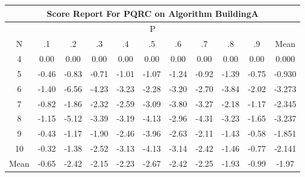 \documentclass[11pt,a4paper]{report}
\begin{document}
\begin{longtable}{ | c || c | c | c | c | c | c | c | c | c || c |}
\hline
\multicolumn{11}{|c|}{ Score Report For PQRC on Algorithm BuildingA} \\
\hline
\multicolumn{11}{|c|}{ P } \\
\hline
N & .1 & .2 & .3 & .4 & .5 & .6 & .7 & .8 & .9 & Mean\\
 \hline
 \hline
 \endhead
  4 &  \cellcolor[HTML]{FFFFFF} 0.00 &  \cellcolor[HTML]{FFFFFF} 0.00 &  \cellcolor[HTML]{FFFFFF} 0.00 &  \cellcolor[HTML]{FFFFFF} 0.00 &  \cellcolor[HTML]{FFFFFF} 0.00 &  \cellcolor[HTML]{FFFFFF} 0.00 &  \cellcolor[HTML]{FFFFFF} 0.00 &  \cellcolor[HTML]{FFFFFF} 0.00 &  \cellcolor[HTML]{FFFFFF} 0.00 & 0.000 \\
  5 &  \cellcolor[HTML]{FFF7F7} -0.46 &  \cellcolor[HTML]{FFE7E7} -0.83 &  \cellcolor[HTML]{FFEFEF} -0.71 &  \cellcolor[HTML]{FFE7E7} -1.01 &  \cellcolor[HTML]{FFE7E7} -1.07 &  \cellcolor[HTML]{FFDFDF} -1.24 &  \cellcolor[HTML]{FFE7E7} -0.92 &  \cellcolor[HTML]{FFDFDF} -1.39 &  \cellcolor[HTML]{FFEFEF} -0.75 & -0.930 \\
  6 &  \cellcolor[HTML]{FFDFDF} -1.40 &  \cellcolor[HTML]{FF5858} -6.56 &  \cellcolor[HTML]{FF9797} -4.23 &  \cellcolor[HTML]{FFAFAF} -3.23 &  \cellcolor[HTML]{FFC7C7} -2.28 &  \cellcolor[HTML]{FFAFAF} -3.20 &  \cellcolor[HTML]{FFB7B7} -2.70 &  \cellcolor[HTML]{FF9F9F} -3.84 &  \cellcolor[HTML]{FFCFCF} -2.02 & -3.273 \\
  7 &  \cellcolor[HTML]{FFE7E7} -0.82 &  \cellcolor[HTML]{FFCFCF} -1.86 &  \cellcolor[HTML]{FFC7C7} -2.32 &  \cellcolor[HTML]{FFBFBF} -2.59 &  \cellcolor[HTML]{FFAFAF} -3.09 &  \cellcolor[HTML]{FF9F9F} -3.80 &  \cellcolor[HTML]{FFAFAF} -3.27 &  \cellcolor[HTML]{FFC7C7} -2.18 &  \cellcolor[HTML]{FFDFDF} -1.17 & -2.345 \\
  8 &  \cellcolor[HTML]{FFDFDF} -1.15 &  \cellcolor[HTML]{FF8080} -5.12 &  \cellcolor[HTML]{FFA7A7} -3.39 &  \cellcolor[HTML]{FFAFAF} -3.19 &  \cellcolor[HTML]{FF9797} -4.13 &  \cellcolor[HTML]{FFB7B7} -2.96 &  \cellcolor[HTML]{FF8F8F} -4.31 &  \cellcolor[HTML]{FFAFAF} -3.23 &  \cellcolor[HTML]{FFD7D7} -1.65 & -3.237 \\
  9 &  \cellcolor[HTML]{FFF7F7} -0.43 &  \cellcolor[HTML]{FFDFDF} -1.17 &  \cellcolor[HTML]{FFCFCF} -1.90 &  \cellcolor[HTML]{FFBFBF} -2.46 &  \cellcolor[HTML]{FF9F9F} -3.96 &  \cellcolor[HTML]{FFBFBF} -2.63 &  \cellcolor[HTML]{FFC7C7} -2.11 &  \cellcolor[HTML]{FFDFDF} -1.43 &  \cellcolor[HTML]{FFEFEF} -0.58 & -1.851 \\
  10 &  \cellcolor[HTML]{FFF7F7} -0.32 &  \cellcolor[HTML]{FFDFDF} -1.38 &  \cellcolor[HTML]{FFBFBF} -2.52 &  \cellcolor[HTML]{FFAFAF} -3.13 &  \cellcolor[HTML]{FF9797} -4.13 &  \cellcolor[HTML]{FFAFAF} -3.14 &  \cellcolor[HTML]{FFBFBF} -2.42 &  \cellcolor[HTML]{FFD7D7} -1.46 &  \cellcolor[HTML]{FFEFEF} -0.77 & -2.141 \\
 \hline
 \hline
Mean &  \cellcolor[HTML]{FFEFEF} -0.65 &  \cellcolor[HTML]{FFBFBF} -2.42 &  \cellcolor[HTML]{FFC7C7} -2.15 &  \cellcolor[HTML]{FFC7C7} -2.23 &  \cellcolor[HTML]{FFBFBF} -2.67 &  \cellcolor[HTML]{FFBFBF} -2.42 &  \cellcolor[HTML]{FFC7C7} -2.25 &  \cellcolor[HTML]{FFCFCF} -1.93 &  \cellcolor[HTML]{FFE7E7} -0.99 &  \cellcolor[HTML]{FFCFCF} -1.97
\end{longtable}
\end{document}
